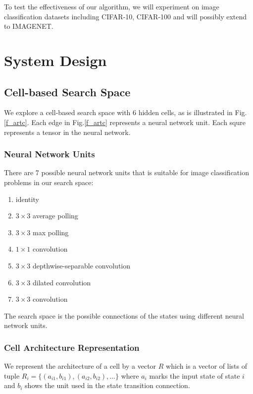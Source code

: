 \documentclass[conference]{IEEEtran}
\begin{document}
    To test the effectiveness of our algorithm, we will experiment on image classification datasets including CIFAR-10, CIFAR-100 and will possibly extend to IMAGENET.


  \section{System Design}
  \subsection{Cell-based Search Space}

  We explore a cell-based search space with 6 hidden cells, as is illustrated in Fig.\ref{f_artc}. Each edge in Fig.\ref{f_artc} represents a neural network unit. Each squre represents a tensor in the neural network.

  \subsubsection{Neural Network Units}
  
  There are 7 possible neural network units that is suitable for image classification problems in our search space:

      \begin{enumerate}
        \item identity
        \item $3\times3$ average polling
        \item $3\times3$ max polling
        \item $1\times1$ convolution
        \item $3\times3$ depthwise-separable convolution
        \item $3\times3$ dilated convolution
        \item $3\times3$ convolution
      \end{enumerate}

  The search space is the possible connections of the states using different neural network units.

  \subsubsection{Cell Architecture Representation}

  We represent the architecture of a cell by a vector $R$ which is a vector of lists of tuple $R_{i} = \{(a_{i1}, b_{i1}), (a_{i2}, b_{i2}), ...\}$ where $a_i$ marks the input state of state $i$ and $b_i$ shows the unit used in the state transition connection.
\end{document}
